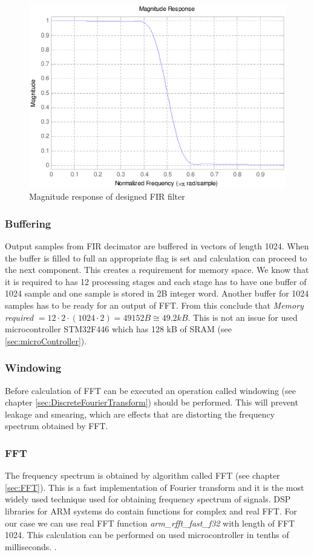 \documentclass[twoside]{ctuthesis}
\theoremstyle{plain}
\theoremstyle{definition}
\theoremstyle{note}
\begin{document}
\begin{figure}[h]
	\centering
	\includegraphics[width=1.0\textwidth]{magnitudeResponse.eps}
	\caption{Magnitude response of designed FIR filter}
	\label{fig:MagnitudeResponse}
\end{figure}

\subsubsection{Buffering}
Output samples from FIR decimator are buffered in vectors of length 1024. When the buffer is filled to full an appropriate flag is set and calculation can proceed to the next component. This creates a requirement for memory space. We know that it is required to has 12 processing stages and each stage has to have one buffer of 1024 sample and one sample is stored in 2B integer word. Another buffer for 1024 samples has to be ready for an output of FFT. From this conclude that \textit{Memory required} $= 12 \cdot 2 \cdot(1024 \cdot 2)=49152B\cong49.2kB$. This is not an issue for used microcontroller STM32F446 which has 128 kB of SRAM (see \ref{sec:microController}).

\subsubsection{Windowing}
Before calculation of FFT can be executed an operation called windowing (see chapter \ref{sec:DiscreteFourierTransform}) should be performed. This will prevent leakage and smearing, which are effects that are distorting the frequency spectrum obtained by FFT.

\subsubsection{FFT}
The frequency spectrum is obtained by algorithm called FFT (see chapter \ref{sec:FFT}). This is a fast implementation of Fourier transform and it is the most widely used technique used for obtaining frequency spectrum of signals. DSP libraries for ARM systems do contain functions for complex and real FFT. For our case we can use real FFT function \textit{arm\_rfft\_fast\_f32} with length of FFT 1024. This calculation can be performed on used microcontroller in tenths of milliseconds. \cite{cite:STM32_DSP_library}.
\end{document}
